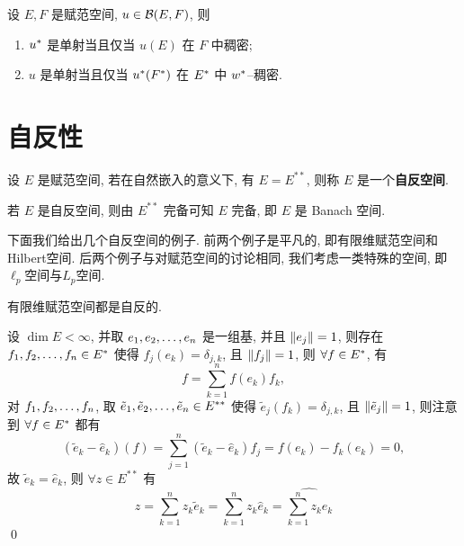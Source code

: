 	\begin{Corollary}
		设 $ E, F $ 是赋范空间, $u\in\mathcal{B}(E, F)$, 则
		\begin{enumerate}[(1)]
			\item $ u^{*} $ 是单射当且仅当 $ u(E) $ 在 $ F $ 中稠密;
			\item $ u $ 是单射当且仅当 $ u^{*}(F^{*}) $ 在 $ E^{*} $ 中 $ w^{*} $--稠密.
		\end{enumerate}	
	\end{Corollary}

\section{自反性}
	\begin{Definition}[自反空间]\label{def:自反空间}
		设 $ E $ 是赋范空间, 若在自然嵌入的意义下, 有 $ E=E^{**} $, 则称 $ E $ 是一个\textbf{自反空间}.
	\end{Definition}
	\begin{Remark}
		若 $ E $ 是自反空间, 则由 $ E^{**} $ 完备可知 $ E $ 完备, 即 $ E $ 是 Banach 空间.
	\end{Remark}
	
	下面我们给出几个自反空间的例子. 前两个例子是平凡的, 即有限维赋范空间和Hilbert空间. 后两个例子与对赋范空间的讨论相同, 我们考虑一类特殊的空间, 即$ \ell_p $空间与$ L_p $空间.
	
	\begin{Proposition}
		有限维赋范空间都是自反的.
	\end{Proposition}
	\begin{Proof}
		设 $ \dim E<\infty $, 并取 $ e_{1}, e_{2}, \dots, e_{n} $ 是一组基, 并且 $ \left\| e_{j} \right\|=1 $, 则存在 $ f_{1}, f_{2}, \dots, f_{n}\in E^{*} $ 使得 $ f_{j}(e_{k})=\delta_{j, k} $, 且 $ \left\| f_{j} \right\|=1 $, 则 $ \forall f\in E^{*} $, 有
		\[
			f=\sum_{k=1}^{n}f(e_{k})f_{k},
		\]
		对 $ f_{1}, f_{2}, \dots, f_{n} $, 取 $ \tilde{e}_{1}, \tilde{e}_{2}, \dots, \tilde{e}_{n}\in E^{**} $ 使得 $ \tilde{e}_{j}(f_{k})=\delta_{j, k} $, 且 $ \left\| \tilde{e}_{j} \right\|=1 $, 则注意到 $ \forall f\in E^{*} $ 都有
		\[
			(\tilde{e}_{k}-\hat{e}_{k})(f)=\sum_{j=1}^{n}(\tilde{e}_{k}-\hat{e}_{k})f_{j}=f(e_{k})-f_{k}(e_{k})=0,
		\] 
		故 $ \tilde{e}_{k}=\hat{e}_{k} $, 则 $ \forall z\in E^{**} $ 有
		\[
			z=\sum_{k=1}^{n}z_{k}\tilde{e}_{k}=\sum_{k=1}^{n}z_{k}\hat{e}_{k}=\widehat{\sum_{k=1}^{n}z_{k}e_{k}}
		\]
		\qed
	\end{Proof}

